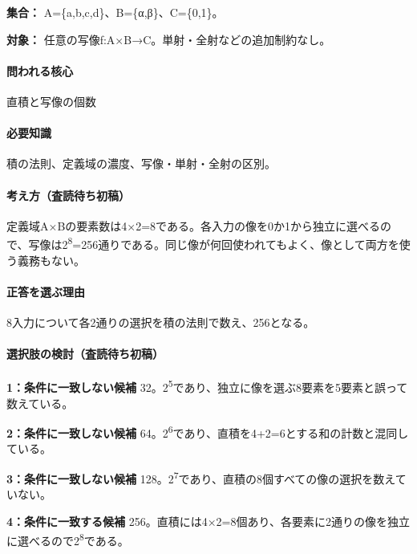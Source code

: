 \noindent\textbf{集合：} A=\{a,b,c,d\}、B=\{α,β\}、C=\{0,1\}。\par

\noindent\textbf{対象：} 任意の写像f:A×B→C。単射・全射などの追加制約なし。\par

\paragraph{問われる核心} 直積と写像の個数

\paragraph{必要知識} 積の法則、定義域の濃度、写像・単射・全射の区別。

\paragraph{考え方（査読待ち初稿）} 定義域A×Bの要素数は4×2=\allowbreak{}8である。各入力の像を0か1から独立に選べるので、写像は2\textsuperscript{8}=256通りである。同じ像が何回使われてもよく、像として両方を使う義務もない。

\paragraph{正答を選ぶ理由} 8入力について各2通りの選択を積の法則で数え、256となる。

\paragraph{選択肢の検討（査読待ち初稿）}\mbox{}\par

\noindent\textbf{1：条件に一致しない候補} 32。2\textsuperscript{5}であり、独立に像を選ぶ8要素を5要素と誤って数えている。\par

\noindent\textbf{2：条件に一致しない候補} 64。2\textsuperscript{6}であり、直積を4+2=\allowbreak{}6とする和の計数と混同している。\par

\noindent\textbf{3：条件に一致しない候補} 128。2\textsuperscript{7}であり、直積の8個すべての像の選択を数えていない。\par

\noindent\textbf{4：条件に一致する候補} 256。直積には4×2=\allowbreak{}8個あり、各要素に2通りの像を独立に選べるので2\textsuperscript{8}である。\par

